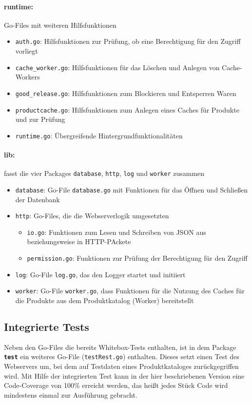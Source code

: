 \paragraph{runtime:} Go-Files mit weiteren Hilfsfunktionen
	\begin{itemize}	
	\item \texttt{auth.go}: Hilfsfunktionen zur Prüfung, ob eine Berechtigung für den Zugriff vorliegt
	\item \texttt{cache\_worker.go}: Hilfsfunktionen für das Löschen und Anlegen von Cache-Workers
	\item \texttt{good\_release.go}: Hilfsfunktionen zum Blockieren und Entsperren Waren
	\item \texttt{productcache.go}: Hilfsfunktionen zum Anlegen eines Caches für Produkte und zur Prüfung
	\item \texttt{runtime.go}: Übergreifende Hintergrundfunktionalitäten	
	\end{itemize}
	


\newpage
\paragraph{lib:} fasst die vier Packages \texttt{database}, \texttt{http}, \texttt{log} und \texttt{worker} zusammen

	\begin{itemize}
	\item \texttt{database}: Go-File \texttt{database.go} mit Funktionen für das Öffnen und Schließen der Datenbank
	\item \texttt{http}: Go-Files, die die Webserverlogik umgesetzten
		\begin{itemize}
		\item \texttt{io.go}: Funktionen zum Lesen und Schreiben von JSON aus beziehungsweise in HTTP-PAckete
		\item \texttt{permission.go}: Funktionen zur Prüfung der Berechtigung für den Zugriff
		\end{itemize}	
	\item \texttt{log}: Go-File \texttt{log.go}, das den Logger startet und initiiert
	\item \texttt{worker}: Go-File \texttt{worker.go}, dass Funktionen für die Nutzung des Caches für die Produkte aus dem Produktkatalog (Worker) bereitstellt 
	\end{itemize}

\subsection{Integrierte Tests}
\label{subsec: Integrierte Test}
Neben den Go-Files die bereits Whitebox-Tests enthalten, ist in dem Package \textbf{\texttt{test}} ein weiteres Go-File (\texttt{testRest.go}) enthalten. Dieses setzt einen Test des Webservers um, bei dem auf Testdaten eines Produktkataloges zurückgegriffen wird. Mit Hilfe der integrierten Test kann in der hier beschriebenen Version eine Code-Coverage von 100\% erreicht werden, das heißt jedes Stück Code wird mindestens einmal zur Ausführung gebracht.

